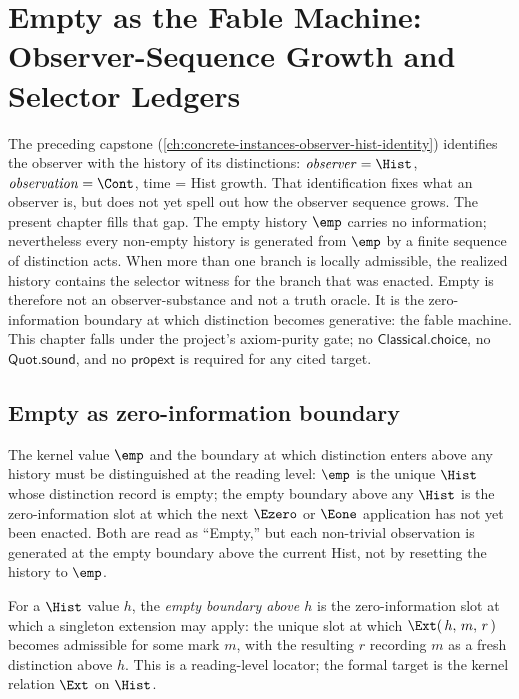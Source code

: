 \chapter{Empty as the Fable Machine: Observer-Sequence Growth and Selector Ledgers}
\label{ch:concrete-instances-empty-fable-machine}

The preceding capstone (\autoref{ch:concrete-instances-observer-hist-identity}) identifies the observer with the history of its distinctions: $\mathit{observer} = \Hist$, $\mathit{observation} = \Cont$, time = Hist growth. That identification fixes what an observer is, but does not yet spell out how the observer sequence grows. The present chapter fills that gap. The empty history $\emp$ carries no information; nevertheless every non-empty history is generated from $\emp$ by a finite sequence of distinction acts. When more than one branch is locally admissible, the realized history contains the selector witness for the branch that was enacted. Empty is therefore not an observer-substance and not a truth oracle. It is the zero-information boundary at which distinction becomes generative: the fable machine. This chapter falls under the project's axiom-purity gate; no $\mathsf{Classical.choice}$, no $\mathsf{Quot.sound}$, and no $\mathsf{propext}$ is required for any cited target.

\section{Empty as zero-information boundary}
\label{sec:efm-empty-vs-e}

The kernel value $\emp$ and the boundary at which distinction enters above any history must be distinguished at the reading level: $\emp$ is the unique $\Hist$ whose distinction record is empty; the empty boundary above any $\Hist$ is the zero-information slot at which the next $\Ezero$ or $\Eone$ application has not yet been enacted. Both are read as ``Empty,'' but each non-trivial observation is generated at the empty boundary above the current Hist, not by resetting the history to $\emp$.

\begin{definition}
\label{def:efm-empty-boundary}
For a $\Hist$ value $h$, the \emph{empty boundary above $h$} is the zero-information slot at which a singleton extension may apply: the unique slot at which $\Ext(\,h,\,m,\,r\,)$ becomes admissible for some mark $m$, with the resulting $r$ recording $m$ as a fresh distinction above $h$. This is a reading-level locator; the formal target is the kernel relation $\Ext$ on $\Hist$.
\end{definition}

